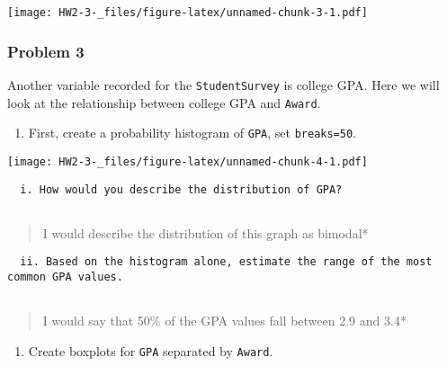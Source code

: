 \documentclass[]{article}
\newenvironment{Shaded}{\begin{snugshade}}{\end{snugshade}}
\newcommand{\DataTypeTok}[1]{\textcolor[rgb]{0.13,0.29,0.53}{#1}}
\newcommand{\DecValTok}[1]{\textcolor[rgb]{0.00,0.00,0.81}{#1}}
\newcommand{\KeywordTok}[1]{\textcolor[rgb]{0.13,0.29,0.53}{\textbf{#1}}}
\newcommand{\NormalTok}[1]{#1}
\newcommand{\OperatorTok}[1]{\textcolor[rgb]{0.81,0.36,0.00}{\textbf{#1}}}
\providecommand{\tightlist}{%
  \setlength{\itemsep}{0pt}\setlength{\parskip}{0pt}}
\begin{document}
\texttt{[image: HW2-3-\_files/figure-latex/unnamed-chunk-3-1.pdf]}

\hypertarget{problem-3}{%
\subsubsection{Problem 3}\label{problem-3}}

Another variable recorded for the \texttt{StudentSurvey} is college GPA.
Here we will look at the relationship between college GPA and
\texttt{Award}.

\begin{enumerate}
\def\labelenumi{\alph{enumi})}
\tightlist
\item
  First, create a probability histogram of \texttt{GPA}, set
  \texttt{breaks=50}.
\end{enumerate}

\begin{Shaded}
\end{Shaded}

\texttt{[image: HW2-3-\_files/figure-latex/unnamed-chunk-4-1.pdf]}

\begin{verbatim}
  i. How would you describe the distribution of GPA?
  
\end{verbatim}

\begin{quote}
I would describe the distribution of this graph as bimodal*
\end{quote}

\begin{verbatim}
  ii. Based on the histogram alone, estimate the range of the most common GPA values.
  
\end{verbatim}

\begin{quote}
I would say that 50\% of the GPA values fall between 2.9 and 3.4*
\end{quote}

\begin{enumerate}
\def\labelenumi{\alph{enumi})}
\setcounter{enumi}{1}
\tightlist
\item
  Create boxplots for \texttt{GPA} separated by \texttt{Award}.
\end{enumerate}
\end{document}
